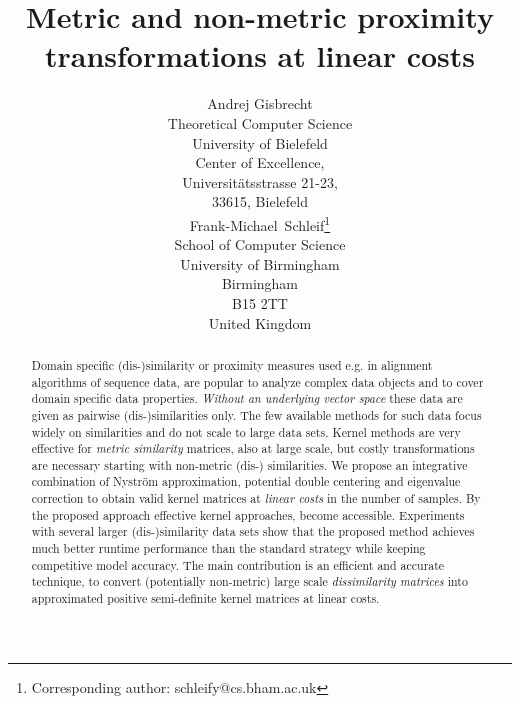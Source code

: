\documentclass[twoside,11pt]{article}
\begin{document}
\title{Metric and non-metric proximity\\ transformations at linear costs}
\author{Andrej Gisbrecht\\
       Theoretical Computer Science\\
       University of Bielefeld\\
       Center of Excellence,\\
       Universit\"atsstrasse 21-23, \\
       33615, Bielefeld\\
       Frank-Michael~Schleif\footnote{Corresponding author: schleify@cs.bham.ac.uk}\\
       School of Computer Science\\	
       University of Birmingham\\
       Birmingham\\
       B15 2TT\\
       United Kingdom}


\maketitle              

\begin{abstract}Domain specific (dis-)similarity or proximity measures used e.g. in alignment algorithms of sequence data, are popular to analyze
         complex data objects and to cover domain specific data properties. \emph{Without an underlying vector space} these data are given as
	pairwise (dis-)similarities only. The few available methods for such data focus widely on similarities and do not scale to large data sets. 
	Kernel methods are very effective for \emph{metric similarity} matrices, also at large scale, but costly transformations are necessary starting 
	with non-metric (dis-) similarities. We propose an integrative combination of Nystr\"om approximation, potential double centering and 
         eigenvalue correction to obtain valid kernel matrices at \emph{linear costs} in the number of samples. By the proposed approach 
	effective kernel approaches, become accessible. Experiments with several larger (dis-)similarity data sets show that the proposed 
	method achieves much better runtime performance than the standard strategy while keeping competitive model accuracy. 
	The main contribution is an efficient and accurate technique, to convert (potentially non-metric) large scale \emph{dissimilarity matrices} 
	into approximated positive semi-definite kernel matrices at linear costs.
\end{abstract}
\end{document}
